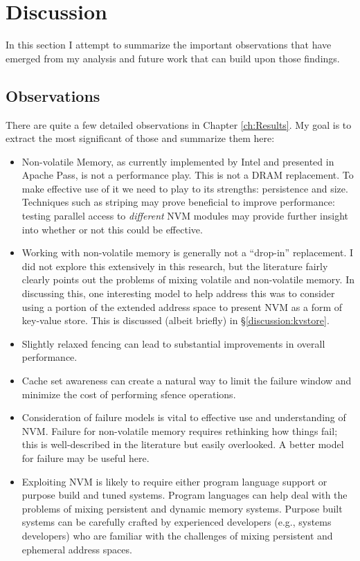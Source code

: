 
\chapter{Discussion}
\label{ch:Discussion}

In this section I attempt to summarize the important observations that have emerged from my analysis and future work that can build upon those findings.

\section{Observations}

There are quite a few detailed observations in Chapter \ref{ch:Results}.  My goal is to extract the most significant of those and summarize them here:

\begin{itemize}
    \item Non-volatile Memory, as currently implemented by Intel and presented in Apache Pass, is not a performance play.  This is not a DRAM replacement. To make effective use of it we need to play to its strengths: persistence and size. Techniques such as striping may prove beneficial to improve performance: testing parallel access to \textit{different} NVM modules may provide further insight into whether or not this could be effective.
    \item Working with non-volatile memory is generally not a ``drop-in'' replacement.  I did not explore this extensively in this research, but the literature fairly clearly points out the problems of mixing volatile and non-volatile memory.  In discussing this, one interesting model to help address this was to consider using a portion of the extended address space to present NVM as a form of key-value store.  This is discussed (albeit briefly) in \S \ref{discussion:kvstore}.
    \item Slightly relaxed fencing can lead to substantial improvements in overall performance.
    \item Cache set awareness can create a natural way to limit the failure window and minimize the cost of performing sfence operations.
    \item Consideration of failure models is vital to effective use and understanding of NVM.  Failure for non-volatile memory requires rethinking how things fail; this is well-described in the literature but easily overlooked.  A better model for failure may be useful here.
    \item Exploiting NVM is likely to require either program language support or purpose build and tuned systems.  Program languages can help deal with the problems of mixing persistent and dynamic memory systems.  Purpose built systems can be carefully crafted by experienced developers (e.g., systems developers) who are familiar with the challenges of mixing persistent and ephemeral address spaces.
\end{itemize}


